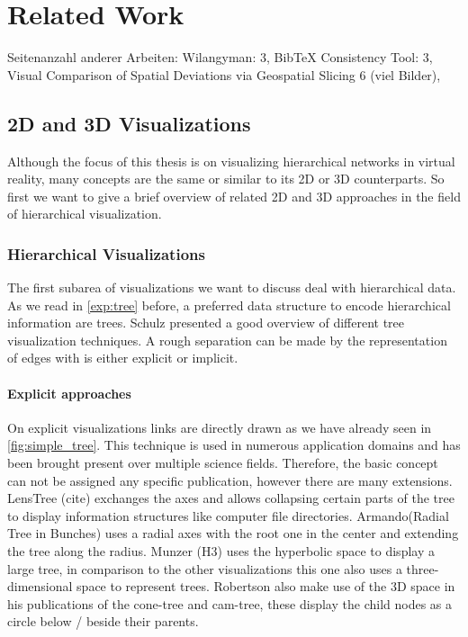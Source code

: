 \chapter{Related Work}
Seitenanzahl anderer Arbeiten: Wilangyman: 3, BibTeX Consistency Tool: 3, Visual Comparison of Spatial Deviations via Geospatial Slicing 6 (viel Bilder), 

\section{2D and 3D Visualizations}

Although the focus of this thesis is on visualizing hierarchical networks in virtual reality, many concepts are the same or similar to its 2D or 3D counterparts. So first we want to give a brief overview of related 2D and 3D approaches in the field of hierarchical visualization.

\subsection{Hierarchical Visualizations}

The first subarea of visualizations we want to discuss deal with hierarchical data. As we read in \ref{exp:tree} before, a preferred data structure to encode hierarchical information are trees.
Schulz \cite{schulz_treevisnet_2011} presented a good overview of different tree visualization techniques. A rough separation can be made by the representation of edges with is either explicit or implicit. 

\subsubsection{Explicit approaches}
On explicit visualizations links are directly drawn as we have already seen in \ref{fig:simple_tree}. This technique is used in numerous application domains and has been brought present over multiple science fields. Therefore, the basic concept can not be assigned any specific publication, however there are many extensions. 
LensTree (cite) exchanges the axes and allows collapsing certain parts of the tree to display information structures like computer file directories. 
Armando(Radial Tree in Bunches) uses a radial axes with the root one in the center and extending the tree along the radius. 
Munzer (H3) uses the hyperbolic space to display a large tree, in comparison to the other visualizations this one also uses a three-dimensional space to represent trees.
Robertson also make use of the 3D space in his publications of the cone-tree and cam-tree, these display the child nodes as a circle below / beside their parents.  

